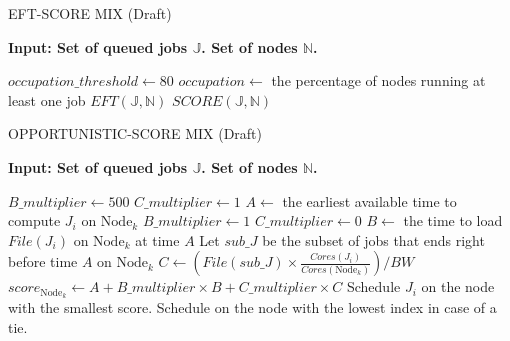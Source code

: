 \documentclass[conference,10pt]{IEEEtran}
\newcommand{\Node}[1]{\ensuremath{\mathrm{Node}_{#1}}\xspace}
\newcommand{\file}{\ensuremath{\mathit{File}}\xspace}
\newcommand{\memory}{\ensuremath{\mathit{Mem}}\xspace}
\newcommand{\bandwidth}{\mathit{BW}\xspace}
\newcommand{\core}{\mathit{Cores}\xspace}
\newcommand{\jobset}{\ensuremath{\mathbb{J}}\xspace}
\newcommand{\nodeset}{\ensuremath{\mathbb{N}}\xspace}
\begin{document}
\begin{algorithm}[htbp]
\caption{EFT-SCORE MIX (Draft)}
\hspace*{\algorithmicindent} \textbf{Input: Set of queued jobs $\jobset$. Set of nodes $\nodeset$.}
\begin{algorithmic}[1]
\State $occupation\_threshold \gets 80$ 
\State $occupation \gets$ the percentage of nodes running at least one job
		\State $EFT(\jobset,\nodeset)$
	\Else
		\State $SCORE(\jobset,\nodeset)$
	\EndIf
\end{algorithmic}
\end{algorithm}

\begin{algorithm}[htbp]
\caption{OPPORTUNISTIC-SCORE MIX (Draft)}
\hspace*{\algorithmicindent} \textbf{Input: Set of queued jobs $\jobset$. Set of nodes $\nodeset$.}
\begin{algorithmic}[1]
\ForEach {$J_i \in \jobset$}
	\State $B\_multiplier \gets 500$
	\State $C\_multiplier \gets 1$
	\ForEach {$\Node{k} \in \nodeset$}
		\State $A \gets$ the earliest available time to compute $J_i$ on $\Node{k}$
			\State $B\_multiplier \gets 1$
			\State $C\_multiplier \gets 0$
		\EndIf
		\State $B \gets$ the time to load $\file(J_i)$ on $\Node{k}$ at time $A$
		\State Let $\mathit{sub\_J}$ be the subset of jobs that ends right before time $A$ on $\Node{k}$
		\State $C \gets (\file(\mathit{sub\_J}) \times \frac{\core(J_i)}{\core(\Node{k})})/\bandwidth$
		\State $score_{\Node{k}} \gets A + B\_multiplier \times B + C\_multiplier \times C$
	\EndFor
	\State Schedule $J_i$ on the node with the smallest score. Schedule on the node with the lowest index in case of a tie.
\EndFor
\end{algorithmic}
\end{algorithm}
\end{document}

